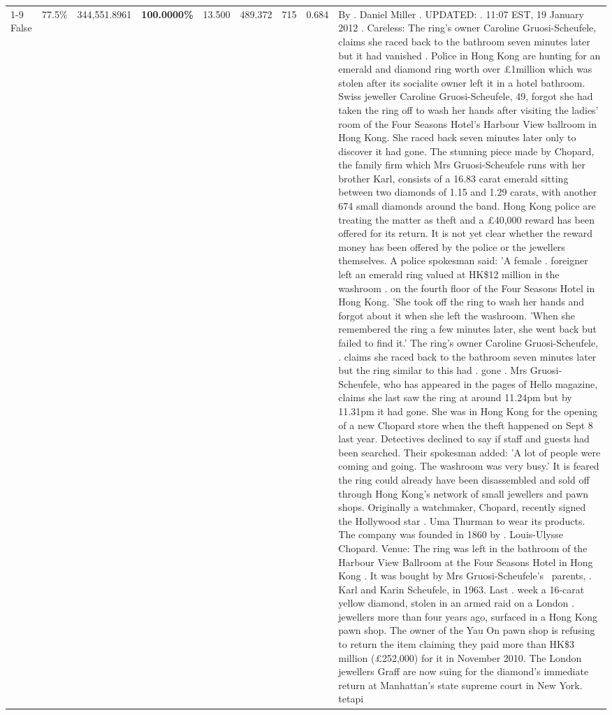 \begin{table}[H]
\begin{tabular}{lllrlllll}
\cline{1-9}
False & 77.5\% & 344,551.8961 & \bfseries \color{red} 100.0000\% & 13.500 & 489.372 & 715 & 0.684 & By . Daniel Miller . UPDATED: . 11:07 EST, 19 January 2012 . Careless: The ring's owner Caroline Gruosi-Scheufele, claims she raced back to the bathroom seven minutes later but it had vanished . Police in Hong Kong are hunting for an emerald and diamond ring worth over £1million which was stolen after its socialite owner left it in a hotel bathroom. Swiss jeweller Caroline Gruosi-Scheufele, 49, forgot she had taken the ring off to wash her hands after visiting the ladies' room of the Four Seasons Hotel's Harbour View ballroom in Hong Kong. She raced back seven minutes later only to discover it had gone. The stunning piece made by Chopard, the family firm which Mrs Gruosi-Scheufele runs with her brother Karl, consists of a 16.83 carat emerald sitting between two diamonds of 1.15 and 1.29 carats, with another 674 small diamonds around the band. Hong Kong police are treating the matter as theft and a £40,000 reward has been offered for its return. It is not yet clear whether the reward money has been offered by the police or the jewellers themselves. A police spokesman said: 'A female . foreigner left an emerald ring valued at HK\$12 million in the washroom . on the fourth floor of the Four Seasons Hotel in Hong Kong. 'She took off the ring to wash her hands and forgot about it when she left the washroom. 'When she remembered the ring a few minutes later, she went back but failed to find it.' The ring's owner Caroline Gruosi-Scheufele, . claims she raced back to the bathroom seven minutes later but the ring similar to this had . gone . Mrs Gruosi-Scheufele, who has appeared in the pages of Hello magazine, claims she last saw the ring at around 11.24pm but by 11.31pm it had gone. She was in Hong Kong for the opening of a new Chopard store when the theft happened on Sept 8 last year. Detectives declined to say if staff and guests had been searched. Their spokesman added: 'A lot of people were coming and going. The washroom was very busy.' It is feared the ring could already have been disassembled and sold off through Hong Kong's network of small jewellers and pawn shops. Originally a watchmaker, Chopard, recently signed the Hollywood star . Uma Thurman to wear its products. The company was founded in 1860 by . Louis-Ulysse Chopard. Venue: The ring was left in the bathroom of the Harbour View Ballroom at the Four Seasons Hotel in Hong Kong . It was bought by Mrs Gruosi-Scheufele's  parents, . Karl and Karin Scheufele, in 1963. Last . week a 16-carat yellow diamond, stolen in an armed raid on a London . jewellers more than four years ago, surfaced in a Hong Kong pawn shop. The owner of the Yau On pawn shop is refusing to return the item claiming they paid more than HK\$3 million (£252,000) for it in November 2010. The London jewellers Graff are now suing for the diamond’s immediate return at Manhattan’s state supreme court in New York. tetapi \\

\end{tabular}
\end{table}
